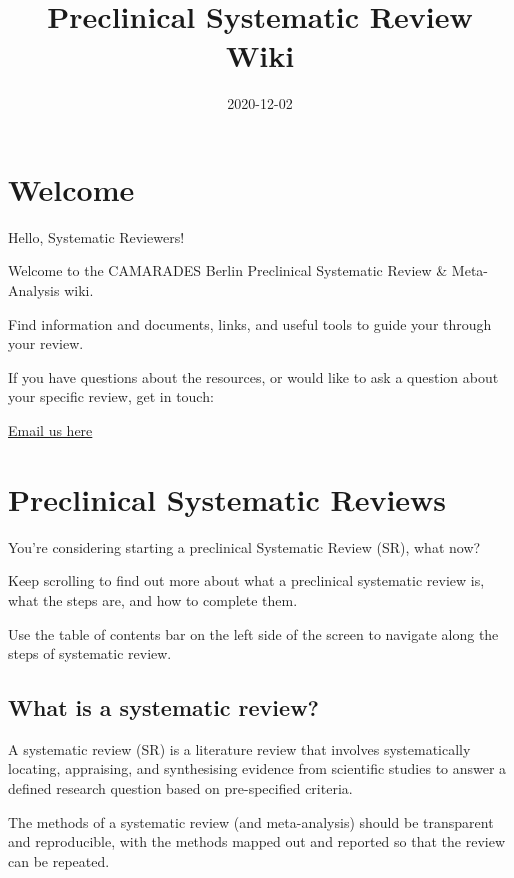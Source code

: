 \documentclass[
]{book}
\title{Preclinical Systematic Review Wiki}
\author{}
\date{\vspace{-2.5em}2020-12-02}
\begin{document}
\maketitle

{
\setcounter{tocdepth}{1}
\tableofcontents
}
\hypertarget{welcome}{%
\chapter{Welcome}\label{welcome}}

Hello, Systematic Reviewers!

Welcome to the CAMARADES Berlin Preclinical Systematic Review \& Meta-Analysis wiki.

Find information and documents, links, and useful tools to guide your through your review.

If you have questions about the resources, or would like to ask a question about your specific review, get in touch:

\href{mailto:CAMARADES.berlin@charite.de}{Email us here}

\hypertarget{intro}{%
\chapter{Preclinical Systematic Reviews}\label{intro}}

You're considering starting a preclinical Systematic Review (SR), what now?

Keep scrolling to find out more about what a preclinical systematic review is, what the steps are, and how to complete them.

Use the table of contents bar on the left side of the screen to navigate along the steps of systematic review.

\hypertarget{what-is-a-systematic-review}{%
\section{What is a systematic review?}\label{what-is-a-systematic-review}}

A systematic review (SR) is a literature review that involves systematically locating, appraising, and synthesising evidence from scientific studies to answer a defined research question based on pre-specified criteria.

The methods of a systematic review (and meta-analysis) should be transparent and reproducible, with the methods mapped out and reported so that the review can be repeated.
\end{document}
